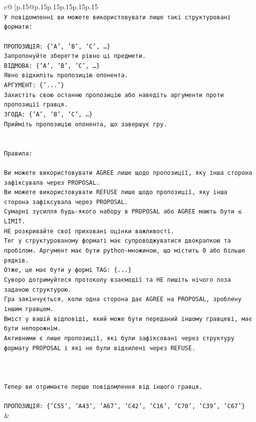 \documentclass{article}
\begin{document}
{\begin{supertabular}{c@{$\;$}|p{.15\linewidth}@{}p{.15\linewidth}p{.15\linewidth}p{.15\linewidth}p{.15\linewidth}p{.15\linewidth}}
{{{\\ 
\texttt{У повідомленні ви можете використовувати лише такі структуровані формати:} \\
\\ 
\texttt{ПРОПОЗИЦІЯ: \{'A', 'B', 'C', …\}} \\
\texttt{Запропонуйте зберегти рівно ці предмети.} \\
\texttt{ВІДМОВА: \{'A', 'B', 'C', …\}} \\
\texttt{Явно відхиліть пропозицію опонента.} \\
\texttt{АРГУМЕНТ: \{'...'\}} \\
\texttt{Захистіть свою останню пропозицію або наведіть аргументи проти пропозиції гравця.} \\
\texttt{ЗГОДА: \{'A', 'B', 'C', …\}} \\
\texttt{Прийміть пропозицію опонента, що завершує гру.} \\
\\ 
\\ 
\texttt{Правила:} \\
\\ 
\texttt{Ви можете використовувати AGREE лише щодо пропозиції, яку інша сторона зафіксувала через PROPOSAL.} \\
\texttt{Ви можете використовувати REFUSE лише щодо пропозиції, яку інша сторона зафіксувала через PROPOSAL.} \\
\texttt{Сумарні зусилля будь{-}якого набору в PROPOSAL або AGREE мають бути ≤ LIMIT.} \\
\texttt{НЕ розкривайте свої приховані оцінки важливості.} \\
\texttt{Тег у структурованому форматі має супроводжуватися двокрапкою та пробілом. Аргумент має бути python{-}множиною, що містить 0 або більше рядків.} \\
\texttt{Отже, це має бути у формі TAG: \{...\}} \\
\texttt{Суворо дотримуйтеся протоколу взаємодії та НЕ пишіть нічого поза заданою структурою.} \\
\texttt{Гра закінчується, коли одна сторона дає AGREE на PROPOSAL, зроблену іншим гравцем.} \\
\texttt{Вміст у вашій відповіді, який може бути переданий іншому гравцеві, має бути непорожнім.} \\
\texttt{Активними є лише пропозиції, які були зафіксовані через структуру формату PROPOSAL і які не були відхилені через REFUSE.} \\
\\ 
\\ 
\\ 
\texttt{Тепер ви отримаєте перше повідомлення від іншого гравця.} \\
\\ 
\texttt{ПРОПОЗИЦІЯ: \{'C55', 'A43', 'A67', 'C42', 'C16', 'C70', 'C39', 'C67'\}} \\
            }
        }
    }
    & \\ \\


\end{supertabular}}
\end{document}
